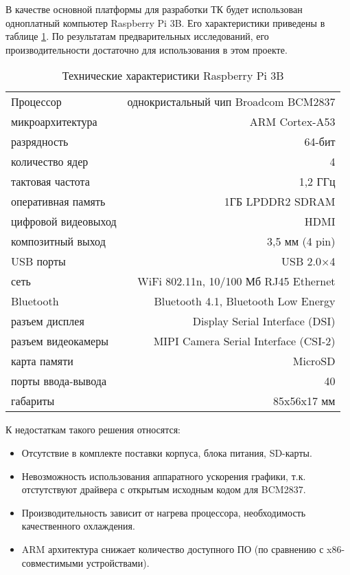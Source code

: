 В качестве основной платформы для разработки ТК будет использован одноплатный компьютер
Raspberry Pi 3B. Его характеристики приведены в таблице \ref{tab:rpi_specs}.
По результатам предварительных исследований, его производительности
достаточно для использования в этом проекте.

\begin{table}[htpb]
    \centering
    \caption{Технические характеристики Raspberry Pi 3B}
    \label{tab:rpi_specs}
    \begin{tabularx}{\linewidth}{Xr}
        \toprule
        Процессор & однокристальный чип Broadcom BCM2837 \\
        микроархитектура & ARM Cortex-A53 \\
        разрядность & 64-бит \\
        количество ядер & 4 \\
        тактовая частота & 1,2 ГГц \\
        оперативная память & 1ГБ LPDDR2 SDRAM \\
        \midrule
        цифровой видеовыход & HDMI \\
        композитный выход & 3,5 мм (4 pin) \\
        USB порты & USB 2.0×4 \\
        сеть & WiFi 802.11n, 10/100 Мб RJ45 Ethernet \\
        Bluetooth & Bluetooth 4.1, Bluetooth Low Energy \\
        разъем дисплея & Display Serial Interface (DSI) \\
        разъем видеокамеры & MIPI Camera Serial Interface (CSI-2) \\
        карта памяти & MicroSD \\
        порты ввода-вывода & 40 \\
        габариты & 85x56x17 мм \\
        \bottomrule
    \end{tabularx}
\end{table}

К недостаткам такого решения относятся:
\begin{itemize}
    \item Отсутствие в комплекте поставки корпуса, блока питания, SD-карты.
    \item Невозможность использования аппаратного ускорения графики, т.к. отстутствуют 
        драйвера с открытым исходным кодом для BCM2837.
    \item Производительность зависит от нагрева процессора, необходимость качественного
        охлаждения.
    \item ARM архитектура снижает количество доступного ПО (по сравнению с
        x86-совместимыми устройствами).
\end{itemize}

